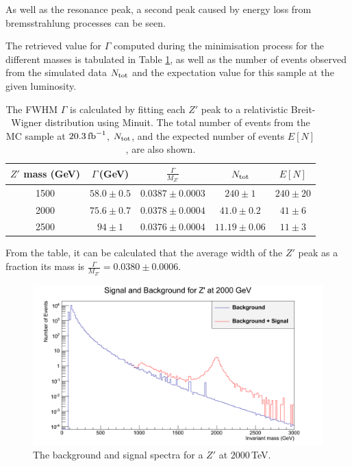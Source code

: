\documentclass{article}
\begin{document}
As well as the resonance peak, a second peak caused by energy loss from bremsstrahlung processes can be seen. 

The retrieved value for $\Gamma$ computed during the minimisation process for the different masses is tabulated in Table \ref{table:resonanceWidth}, as well as the number of events observed from the simulated data $N_{\rm{tot}}$ and the expectation value for this sample at the given luminosity.

\begin{table}[h!t]
\centering
\caption{The FWHM $\Gamma$ is calculated by fitting each $Z'$ peak to a relativistic Breit-Wigner distribution using Minuit. The total number of events from the  MC sample at $20.3\,\rm{fb}^{-1}$, $N_{\rm{tot}}$, and the expected number of events $E[N]$, are also shown. \label{table:resonanceWidth}}
\begin{tabular}{ |c|c|c|c|c| } 
\hline
$Z'$ mass (GeV) & $\Gamma\,$(GeV) & $\frac{\Gamma}{M_{Z'}}$ & $N_{\rm{tot}}$ & $E[N]$\\
\hline
1500 & $58.0\pm0.5$ & $0.0387\pm0.0003$ & $240\pm1$			& $240\pm20$\\
2000 & $75.6\pm0.7$ & $0.0378\pm0.0004$ & $41.0\pm0.2$		& $41\pm6$\\
2500 & $94\pm1$ & $0.0376\pm0.0004$ 	& $11.19\pm0.06$	& $11\pm3$\\
\hline
\end{tabular}
\end{table}

From the table, it can be calculated that the average width of the $Z'$ peak as a fraction its mass is $\frac{\Gamma}{M_{Z'}} = 0.0380\pm0.0006$.

\begin{figure}[h]
    \centering
    \includegraphics[scale=0.3]{images/backgroundSignal.png}
    \caption{ The background and signal spectra for a $Z'$ at $2000\,$TeV.  \label{fig:backgroundSignal}}
\end{figure}
\end{document}
